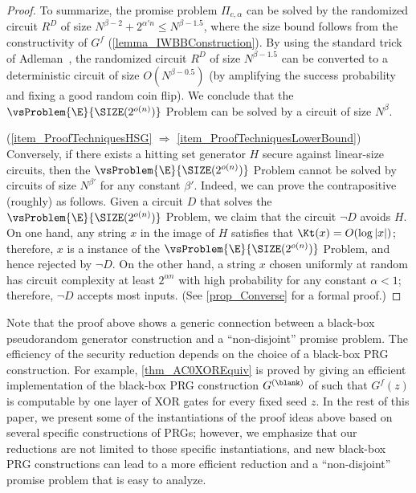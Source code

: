 \documentclass[11pt]{article}
\numberwithin{equation}{section}
\theoremstyle{definition}
\theoremstyle{plain}
\begin{document}
\begin{proof}
  To summarize,
  the promise problem $\Pi_{c, \alpha}$
  can be solved by the randomized circuit $R^D$
  of size $N^{\beta - 2} + 2^{\alpha' n} \le N^{\beta - 1.5}$, where the size bound follows from
  the constructivity of $G^f$ (\cref{lemma_IWBBConstruction}).
  By using the standard trick of Adleman~\cite{Adleman78_focs_conf},
  the randomized circuit $R^D$ of size $N^{\beta - 1.5}$ can be converted to a
  deterministic circuit of size $O(N^{\beta-0.5})$
  (by amplifying the success probability and fixing a good random coin flip).
  We conclude that
  the $\vsProblem{\E}{\SIZE(2^{o(n)})}$ Problem can be solved by a circuit of size $N^{\beta}$.

  (\cref{item_ProofTechniquesHSG} $\Rightarrow$ \ref{item_ProofTechniquesLowerBound})
  Conversely,
  if there exists a hitting set generator $H$ secure against linear-size circuits,
  then the $\vsProblem{\E}{\SIZE(2^{o(n)})}$ Problem cannot be solved by circuits of size $N^{\beta'}$
  for any constant $\beta'$.
  Indeed, we can prove the contrapositive (roughly) as follows.
  Given a circuit $D$ that solves the $\vsProblem{\E}{\SIZE(2^{o(n)})}$ Problem,
  we claim that the circuit $\neg D$ avoids $H$.
  On one hand,
  any string $x$ in the image of $H$ satisfies that $\Kt(x) = O(\log |x|)$;
  therefore, $x$ is a \Yes instance of
  the $\vsProblem{\E}{\SIZE(2^{o(n)})}$ Problem,
  and hence rejected by $\neg D$.
  On the other hand,
  a string $x$ chosen uniformly at random
  has circuit complexity at least $2^{\alpha n}$ with high probability
  for any constant $\alpha < 1$;
  therefore, $\neg D$ accepts most inputs.
  (See \cref{prop_Converse} for a formal proof.)
\end{proof}


Note that the proof above shows a generic connection
between
a black-box pseudorandom generator construction
and
a ``non-disjoint'' promise problem.
The efficiency of the security reduction depends on the choice of a
black-box PRG construction.
For example, \cref{thm_AC0XOREquiv} is proved by giving an efficient implementation
of the black-box PRG construction $G^{(\blank)}$ of \cite{ImpagliazzoW97_stoc_conf}
such that $G^f(z)$ is computable by one layer of XOR gates for every fixed seed $z$.
In the rest of this paper, we present some of the instantiations of
the proof ideas above
based on several specific constructions of PRGs;
however, we emphasize that our reductions are not limited to those specific instantiations,
and new black-box PRG constructions can lead to a more efficient reduction
and a ``non-disjoint'' promise problem that is easy to analyze.
\end{document}
